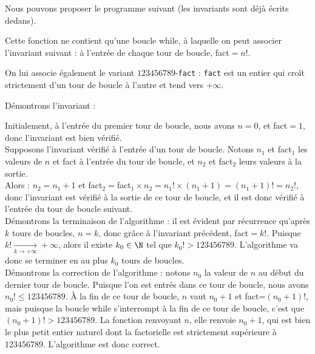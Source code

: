 \exer{}
\setcounter{numques}{0}

Nous pouvons proposer le programme suivant (les invariants sont déjà écrits dedans).


Cette fonction ne contient qu'une boucle while, à laquelle on peut associer l'invariant suivant : à l'entrée de 
chaque tour de boucle, fact$=n!$.

On lui associe également le variant $123456789$-\texttt{fact} : \texttt{fact} est un entier qui croît strictement d'un tour de boucle à l'autre et 
tend vers $+\infty$.

Démontrons l'invariant : 

Initialement, à l'entrée du premier tour de boucle, nous avons $n=0$, et fact$=1$, donc l'invariant est bien vérifié.\\
Supposons l'invariant vérifié à l'entrée d'un tour de boucle. Notons $n_1$ et fact$_1$ les valeurs de $n$ et fact à 
l'entrée du tour de boucle, et $n_2$ et fact$_2$ leurs valeurs à la sortie.\\
Alors : $n_2=n_1+1$ et fact$_2=$fact$_1\times n_2=n_1!\times(n_1+1)=(n_1+1)!=n_2!$, donc l'invariant est vérifié à la 
sortie de ce tour de boucle, et il est donc vérifié à l'entrée du tour de boucle suivant.\\

Démontrons la terminaison de l'algorithme : il est évident par récurrence qu'après $k$ tours de boucles, $n=k$, donc 
grâce à l'invariant précédent, fact$=k!$. Puisque $k!\xrightarrow[k\to+\infty]{}+\infty$, alors il existe $k_0\in\N$ 
tel que $k_0!>123456789$. L'algorithme va donc se terminer en au plus $k_0$ tours de boucles.\\

Démontrons la correction de l'algorithme : notons $n_0$ la valeur de $n$ au début du dernier tour de boucle. Puisque 
l'on est entrés dans ce tour de boucle, nous avons $n_0!\leq 123456789$. À la fin de ce tour de boucle, $n$ vaut 
$n_0+1$ et fact=$(n_0+1)!$, mais puisque la boucle while s'interrompt à la fin de ce tour de boucle, c'est que 
$(n_0+1)!>123456789$. La fonction renvoyant $n$, elle renvoie $n_0+1$, qui est bien le plus petit entier naturel dont 
la factorielle est strictement supérieure à 123456789. L'algorithme est donc correct.

